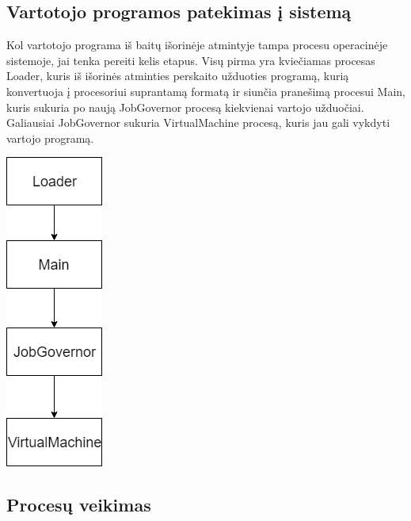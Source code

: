 \documentclass{scrartcl}
\begin{document}
      \subsection{Vartotojo programos patekimas į sistemą}
        Kol vartotojo programa iš baitų išorinėje atmintyje tampa procesu operacinėje sistemoje, jai tenka pereiti kelis etapus. Visų pirma yra kviečiamas procesas Loader, kuris iš išorinės atminties perskaito užduoties programą, kurią konvertuoja į procesoriui suprantamą formatą ir siunčia pranešimą procesui Main, kuris sukuria po naują JobGovernor procesą kiekvienai vartojo užduočiai. Galiausiai JobGovernor sukuria VirtualMachine procesą, kuris jau gali vykdyti vartojo programą.
        \begin{center}
          \includegraphics[scale=0.5]{Program_load}
        \end{center}

      \subsection{Procesų veikimas}
\end{document}
